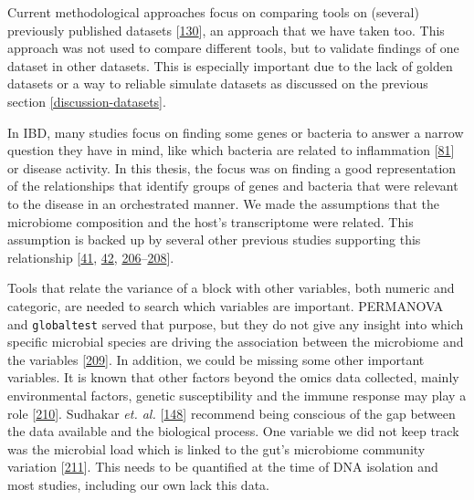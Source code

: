 \documentclass[
  12pt,
  a4paper,
  twoside,
  openright]{book}
\begin{document}
Current methodological approaches focus on comparing tools on (several) previously published datasets {[}\protect\hyperlink{ref-cantini2021}{130}{]}, an approach that we have taken too.
This approach was not used to compare different tools, but to validate findings of one dataset in other datasets.
This is especially important due to the lack of golden datasets or a way to reliable simulate datasets as discussed on the previous section \ref{discussion-datasets}.

In IBD, many studies focus on finding some genes or bacteria to answer a narrow question they have in mind, like which bacteria are related to inflammation {[}\protect\hyperlink{ref-tang2017}{81}{]} or disease activity.
In this thesis, the focus was on finding a good representation of the relationships that identify groups of genes and bacteria that were relevant to the disease in an orchestrated manner.
We made the assumptions that the microbiome composition and the host's transcriptome were related.
This assumption is backed up by several other previous studies supporting this relationship {[}\protect\hyperlink{ref-thomas1998}{41}, \protect\hyperlink{ref-cornish2008}{42}, \protect\hyperlink{ref-holmes2012}{206}--\protect\hyperlink{ref-brand2021}{208}{]}.

Tools that relate the variance of a block with other variables, both numeric and categoric, are needed to search which variables are important.
PERMANOVA and \texttt{globaltest} served that purpose, but they do not give any insight into which specific microbial species are driving the association between the microbiome and the variables {[}\protect\hyperlink{ref-susin2020}{209}{]}.
In addition, we could be missing some other important variables.
It is known that other factors beyond the omics data collected, mainly environmental factors, genetic susceptibility and the immune response may play a role {[}\protect\hyperlink{ref-sartor2006}{210}{]}.
Sudhakar \emph{et. al.} {[}\protect\hyperlink{ref-sudhakar2022}{148}{]} recommend being conscious of the gap between the data available and the biological process.
One variable we did not keep track was the microbial load which is linked to the gut's microbiome community variation {[}\protect\hyperlink{ref-vandeputte2017}{211}{]}.
This needs to be quantified at the time of DNA isolation and most studies, including our own lack this data.
\end{document}
